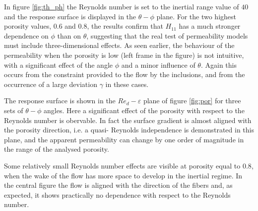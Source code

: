 In figure \ref{fig:th_ph} the Reynolds number is set to the inertial range value of $40$ and  the response surface 
is displayed in the $\theta - \phi$ plane. 
For the two highest porosity values, $0.6$ and $0.8$, the results confirm that $H_{11}$ has a much stronger dependence on
$\phi$ than on $\theta$, suggesting that the real test of permeability models must include three-dimensional effects.
As seen earlier, the behaviour of the permeability when the porosity is low (left frame in the figure) is not intuitive, with 
a significant effect of the angle $\phi$ and a minor influence of $\theta$. Again this occurs
from the constraint provided to the flow by the inclusions, and from the occurrence of a large deviation $\gamma$ in these cases.








The response surface is shown in the $Re_d - \varepsilon$ plane of figure \ref{fig:por} for three sets of $\theta-\phi$ angles. 
Here a significant effect of the porosity with respect to  the Reynolds number is obervable. 
In fact  the surface  gradient is almost aligned with the porosity direction, i.e. a quasi- Reynolds independence is demonstrated  in this plane,
and  the apparent permeability can change by one order of magnitude in the range
of the analysed porosity.

Some relatively small Reynolds number effects are visible at porosity equal to $0.8$, when the wake of the flow has more space to develop in the inertial regime.
In the central figure the flow is aligned with the direction of the fibers and, as expected, it shows practically no dependence with respect to the Reynolds number.


